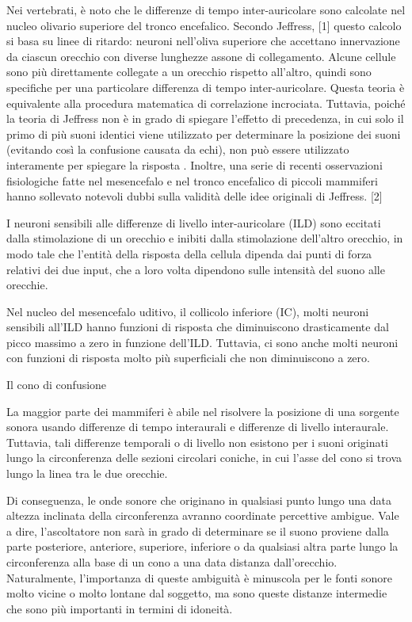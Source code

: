 Nei vertebrati, è noto che le differenze di tempo inter-auricolare sono calcolate nel nucleo olivario superiore del tronco encefalico. Secondo Jeffress, [1] questo calcolo si basa su linee di ritardo: neuroni nell'oliva superiore che accettano innervazione da ciascun orecchio con diverse lunghezze assone di collegamento. Alcune cellule sono più direttamente collegate a un orecchio rispetto all'altro, quindi sono specifiche per una particolare differenza di tempo inter-auricolare. Questa teoria è equivalente alla procedura matematica di correlazione incrociata. Tuttavia, poiché la teoria di Jeffress non è in grado di spiegare l'effetto di precedenza, in cui solo il primo di più suoni identici viene utilizzato per determinare la posizione dei suoni (evitando così la confusione causata da echi), non può essere utilizzato interamente per spiegare la risposta . Inoltre, una serie di recenti osservazioni fisiologiche fatte nel mesencefalo e nel tronco encefalico di piccoli mammiferi hanno sollevato notevoli dubbi sulla validità delle idee originali di Jeffress. [2]

I neuroni sensibili alle differenze di livello inter-auricolare (ILD) sono eccitati dalla stimolazione di un orecchio e inibiti dalla stimolazione dell'altro orecchio, in modo tale che l'entità della risposta della cellula dipenda dai punti di forza relativi dei due input, che a loro volta dipendono sulle intensità del suono alle orecchie.

Nel nucleo del mesencefalo uditivo, il collicolo inferiore (IC), molti neuroni sensibili all'ILD hanno funzioni di risposta che diminuiscono drasticamente dal picco massimo a zero in funzione dell'ILD. Tuttavia, ci sono anche molti neuroni con funzioni di risposta molto più superficiali che non diminuiscono a zero.

Il cono di confusione

La maggior parte dei mammiferi è abile nel risolvere la posizione di una sorgente sonora usando differenze di tempo interaurali e differenze di livello interaurale. Tuttavia, tali differenze temporali o di livello non esistono per i suoni originati lungo la circonferenza delle sezioni circolari coniche, in cui l'asse del cono si trova lungo la linea tra le due orecchie.

Di conseguenza, le onde sonore che originano in qualsiasi punto lungo una data altezza inclinata della circonferenza avranno coordinate percettive ambigue. Vale a dire, l'ascoltatore non sarà in grado di determinare se il suono proviene dalla parte posteriore, anteriore, superiore, inferiore o da qualsiasi altra parte lungo la circonferenza alla base di un cono a una data distanza dall'orecchio. Naturalmente, l'importanza di queste ambiguità è minuscola per le fonti sonore molto vicine o molto lontane dal soggetto, ma sono queste distanze intermedie che sono più importanti in termini di idoneità.

